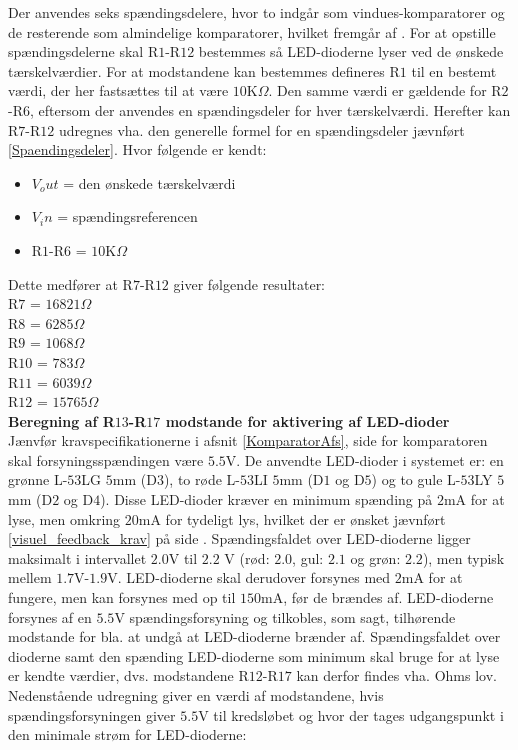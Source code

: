 Der anvendes seks spændingsdelere, hvor to indgår som vindues-komparatorer og de resterende som almindelige komparatorer, hvilket fremgår af  .
For at opstille spændingsdelerne skal R$1$-R$12$ bestemmes så LED-dioderne lyser ved de ønskede tærskelværdier. For at modstandene kan bestemmes defineres R$1$ til en bestemt værdi, der her fastsættes til at være $10$K$\Omega$. Den samme værdi er gældende for R$2$-R$6$, eftersom der anvendes en spændingsdeler for hver tærskelværdi. Herefter kan R$7$-R$12$ udregnes vha. den generelle formel for en spændingsdeler jævnført \eqref{Spaendingsdeler}. Hvor følgende er kendt:
\begin{itemize}
\item $V_out$ = den ønskede tærskelværdi
\item $V_in$ = spændingsreferencen
\item R$1$-R$6$ = $10$K$\Omega$
\end{itemize}

Dette medfører at R$7$-R$12$ giver følgende resultater:\\
R$7$ = $16821\Omega$ \\
R$8$ = $6285\Omega$ \\
R$9$ = $1068\Omega$ \\
R$10$ = $783\Omega$ \\
R$11$ = $6039\Omega$ \\
R$12$ = $15765\Omega$ \\


\noindent\textbf{Beregning af R$13$-R$17$ modstande for aktivering af LED-dioder} \\
Jænvfør kravspecifikationerne i afsnit \ref{KomparatorAfs}, side \pageref{KomparatorAfs} for komparatoren skal forsyningsspændingen være $5.5$V. De anvendte LED-dioder i systemet er: en grønne L-$53$LG $5$mm (D$3$), to røde L-$53$LI $5$mm (D$1$ og D$5$) og to gule L-$53$LY $5$mm (D$2$ og D$4$). Disse LED-dioder kræver en minimum spænding på $2$mA for at lyse, men omkring $20$mA for tydeligt lys, hvilket der er ønsket jævnført \ref{visuel_feedback_krav} på side \pageref{visuel_feedback_krav}.  Spændingsfaldet over LED-dioderne ligger maksimalt i intervallet $2.0$V til $2.2$ V (rød: $2.0$, gul: $2.1$ og grøn: $2.2$), men typisk mellem $1.7$V-$1.9$V. LED-dioderne skal derudover forsynes med $2$mA for at fungere, men kan forsynes med op til $150$mA, før de brændes af. LED-dioderne forsynes af en $5.5$V spændingsforsyning og tilkobles, som sagt, tilhørende modstande for bla. at undgå at LED-dioderne brænder af. Spændingsfaldet over dioderne samt den spænding LED-dioderne som minimum skal bruge for at lyse er kendte værdier, dvs. modstandene R$12$-R$17$ kan derfor findes vha. Ohms lov. Nedenstående udregning giver en værdi af modstandene, hvis spændingsforsyningen giver $5.5$V til kredsløbet og hvor der tages udgangspunkt i den minimale strøm for LED-dioderne:

